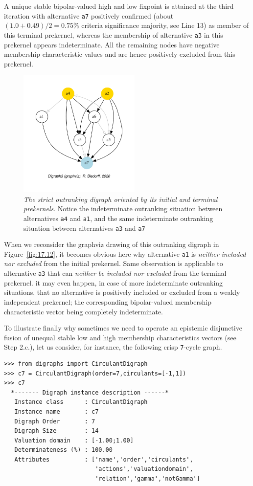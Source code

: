 A unique stable bipolar-valued high and low fixpoint is attained at the third iteration with alternative \texttt{a7} positively confirmed (about $(1.0+0.49)/2 = 0.75\%$ criteria significance majority, see Line 13) as member of this terminal prekernel, whereas the membership of alternative \texttt{a3} in this prekernel appears indeterminate. All the remaining nodes have negative membership characteristic values and are hence positively excluded from this prekernel.
\begin{figure}[ht]
\sidecaption[t]
\includegraphics[width=6cm]{Figures/17-12-bestWorstOrientation.pdf}
\caption[The strict outranking digraph oriented by its initial and terminal prekernels]{\emph{The strict outranking digraph oriented by its initial and terminal prekernels}. Notice the indeterminate outranking situation between alternatives \texttt{a4} and \texttt{a1}, and the same indeterminate outranking situation between alternatives \texttt{a3} and \texttt{a7}}
\label{fig:17.12}       %
\end{figure}

When we reconsider the graphviz drawing of this outranking digraph in Figure~\vref{fig:17.12}, it becomes obvious here why alternative \texttt{a1} is \emph{neither included nor excluded} from the initial prekernel. Same observation is applicable to alternative \texttt{a3} that can \emph{neither be included nor excluded} from the terminal prekernel. it may even happen, in case of more indeterminate outranking situations, that no alternative  is positively included or excluded from a weakly independent prekernel; the corresponding bipolar-valued membership characteristic vector being completely indeterminate.

To illustrate finally why sometimes we need to operate an epistemic disjunctive fusion of unequal stable low and high membership characteristics vectors (see Step 2.c.), let us consider, for instance, the following crisp \texttt{7}-cycle graph.
\begin{lstlisting}
>>> from digraphs import CirculantDigraph
>>> c7 = CirculantDigraph(order=7,circulants=[-1,1])
>>> c7			     
  *------- Digraph instance description ------*
   Instance class      : CirculantDigraph
   Instance name       : c7
   Digraph Order       : 7
   Digraph Size        : 14
   Valuation domain    : [-1.00;1.00]
   Determinateness (%) : 100.00
   Attributes          : ['name','order','circulants',
                          'actions','valuationdomain',
                          'relation','gamma','notGamma']
\end{lstlisting}		       

